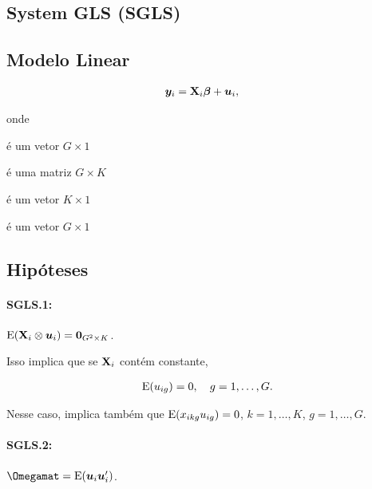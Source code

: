\documentclass[11pt, oneside, a4paper, article]{article}
\numberwithin{equation}{section}
\begin{document}
\begin{description}
\section{System GLS (SGLS)}

\noindent
\citet[Sec.7.4 -- Consistency and Asymptotic Normality of Generalized Least Squares, p.153]{wool-2010} 

\subsection{Modelo Linear}

\vspace{-2 em}
\begin{align*}
\boldsymbol{y}_{i} &= \mathbf{X}_{i}\boldsymbol{\beta} + \boldsymbol{u}_{i},
\end{align*}

\noindent
onde

\vspace{-1 em}
\begin{description}[noitemsep]
	\item[$\yvec$] é um vetor $G \times 1$
	\item[$\Xmat_{i}$] é uma matriz $G \times K$
	\item[$\betavec$] é um vetor $K \times 1$
	\item[$\uvec$] é um vetor $G \times 1$
\end{description}

\subsection{Hipóteses}

\paragraph{SGLS.1:} $\text{E}(\mathbf{X}_{i} \otimes \boldsymbol{u}_{i}) = {\boldsymbol{0}}_{G^2 \times K}$.

\noindent
Isso implica que se $\Xmat_{i}$ contém constante, 

\vspace{-1 em}
\begin{align*}
	\text{E}(u_{ig}) = 0, \quad g=1,\dots, G.
\end{align*}

\noindent
Nesse caso, implica também que $\text{E}(x_{ikg} u_{ig})=0$, $k=1,\dots,K$, $g=1,\dots,G$.

\paragraph{SGLS.2:}  $\Omegamat = \E(\uvec_{i} \uvec_{i}^{\prime})$.


\end{description}
\end{document}

